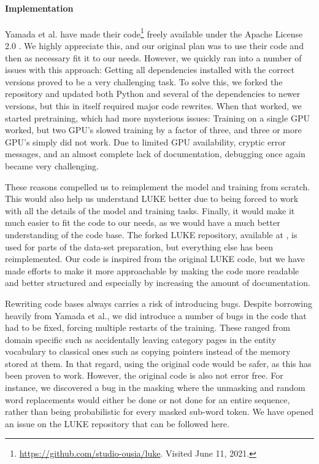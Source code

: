 \documentclass[main.tex]{subfiles}
\begin{document}
\paragraph{Implementation}
Yamada et al. have made their code\footnote{\url{https://github.com/studio-ousia/luke}. Visited June 11, 2021.} freely available under the Apache License 2.0 \cite{apachelicense}.
We highly appreciate this, and our original plan was to use their code and then as necessary fit it to our needs.
However, we quickly ran into a number of issues with this approach:
Getting all dependencies installed with the correct versions proved to be a very challenging task.
To solve this, we forked the repository and updated both Python and several of the dependencies to newer versions, but this in itself required major code rewrites.
When that worked, we started pretraining, which had more mysterious issues:
Training on a single GPU worked, but two GPU's slowed training by a factor of three, and three or more GPU's simply did not work.
Due to limited GPU availability, cryptic error messages, and an almost complete lack of documentation, debugging once again became very challenging.

These reasons compelled us to reimplement the model and training from scratch.
This would also help us understand LUKE better due to being forced to work with all the details of the model and training tasks.
Finally, it would make it much easier to fit the code to our needs, as we would have a much better understanding of the code base.
The forked LUKE repository, available at , is used for parts of the data-set preparation, but everything else has been reimplemented.
Our code is inspired from the original LUKE code, but we have made efforts to make it more approachable by making the code more readable and better structured and especially by increasing the amount of documentation.

Rewriting code bases always carries a risk of introducing bugs.
Despite borrowing heavily from Yamada et al., we did introduce a number of bugs in the code that had to be fixed, forcing multiple restarts of the training.
These ranged from domain specific such as accidentally leaving category pages in the entity vocabulary to classical ones such as copying pointers instead of the memory stored at them.
In that regard, using the original code would be safer, as this has been proven to work.
However, the original code is also not error free.
For instance, we discovered a bug in the masking where the unmasking and random word replacements would either be done or not done for an entire sequence, rather than being probabilistic for every masked sub-word token.
We have opened an issue on the LUKE repository that can be followed here.
\end{document}
